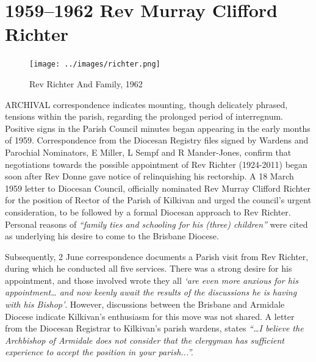\balance


\printendnotes[custom]
\setcounter{endnote}{0}
\chapter{1959--1962 Rev Murray Clifford Richter}
\nobalance








\begin{figure}
\begin{center}
\texttt{[image: ../images/richter.png]}
\caption{Rev Richter And Family, 1962}
\end{center}
\end{figure}




\lettrine[lines=3]{A}{RCHIVAL}
 correspondence indicates mounting, though delicately phrased, tensions within the parish, regarding the prolonged period of interregnum. Positive signs in the Parish Council minutes began appearing in the early months of 1959. Correspondence from the Diocesan Registry files signed by Wardens and Parochial Nominators, E Miller, L Sempf and R Mander-Jones, confirm that negotiations towards the possible appointment of Rev Richter (1924-2011) began soon after Rev Donne gave notice of relinquishing his rectorship. A 18 March 1959 letter to Diocesan Council, officially nominated Rev Murray Clifford Richter for the position of Rector of the Parish of Kilkivan and urged the council's urgent consideration, to be followed by a formal Diocesan approach to Rev Richter. Personal reasons of \emph{``family ties and schooling for his (three) children''} were cited as underlying his desire to come to the Brisbane Diocese.

Subsequently, 2 June correspondence documents a Parish visit from Rev Richter, during which he conducted all five services. There was a strong desire for his appointment, and those involved wrote they all \emph{`are even more anxious for his appointment\ldots{} and now keenly await the results of the discussions he is having with his Bishop'}. However, discussions between the Brisbane and Armidale Diocese indicate Kilkivan's enthusiasm for this move was not shared. A letter from the Diocesan Registrar to Kilkivan's parish wardens, states \emph{``\ldots I believe the Archbishop of Armidale does not consider that the clergyman has sufficient experience to accept the position in your parish...''.}



